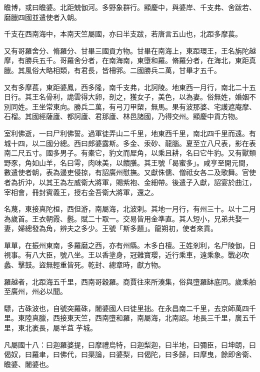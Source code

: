 \begin{pinyinscope}
 瞻博，或曰瞻婆。北距兢伽河。多野象群行。顯慶中，與婆岸、千支弗、舍跋若、磨臘四國並遣使者入朝。



 千支在西南海中，本南天竺屬國，亦曰半支跋，若唐言五山也，北距多摩萇。



 又有哥羅舍分、脩羅分、甘畢三國貢方物。甘畢在南海上，東距環王，王名旃陀越摩，有勝兵五千。哥羅舍分者，在南海南，東墮和羅。脩羅分者，在海北，東距真臘。其風俗大略相類，有君長，皆柵郛。二國勝兵二萬，甘畢才五千。



 又有多摩萇，東距婆鳳，西多隆，南千支弗，北訶陵。地東西一月行，南北二十五日行。其王名骨利，詭雲得大卵，剖之，獲女子，美色，以為妻。俗無姓，婚姻不別同姓。王坐常東向。勝兵二萬，有弓刀甲槊，無馬。果有波那婆、宅護遮庵摩、石榴。其國經薩廬、都訶廬、君那廬、林邑諸國，乃得交州。顯慶中貢方物。



 室利佛逝，一曰尸利佛誓。過軍徒弄山二千里，地東西千里，南北四千里而遠。有城十四，以二國分總。西曰郎婆露斯。多金、汞砂、龍腦。夏至立八尺表，影在表南二尺五寸。國多男子。有橐它，豹文而犀角，以乘且耕，名曰它牛豹。又有獸類野豕，角如山羊，名曰雩，肉味美，以饋膳。其王號「曷蜜多」。咸亨至開元間，數遣使者朝，表為邊吏侵掠，有詔廣州慰撫。又獻侏儒、僧祗女各二及歌舞。官使者為折沖，以其王為左威衛大將軍，賜紫袍、金細帶。後遣子入獻，詔宴於曲江，宰相會，冊封賓義王，授右金吾衛大將軍，還之。



 名蔑，東接真陀桓，西但游，南屬海，北波剌。其地一月行，有州三十。以十二月為歲首。王衣朝霞、氎。賦二十取一。交易皆用金準直。其人短小，兄弟共娶一妻，婦總發為角，辨夫之多少。王號「斯多題」。龍朔初，使者來貢。



 單單，在振州東南，多羅磨之西，亦有州縣。木多白檀。王姓剎利，名尸陵伽，日視事。有八大臣，號八坐。王以香塗身，冠雜寶瓔，近行乘車，遠乘象。戰必吹蠡、擊鼓。盜無輕重皆死。乾封、總章時，獻方物。



 羅越者，北距海五千里，西南哥穀羅。商賈往來所湊集，俗與墮羅缽底同。歲乘舶至廣州，州必以聞。



 驃，古硃波也，自號突羅硃，闍婆國人曰徒里拙。在永昌南二千里，去京師萬四千里。東陸真臘，西接東天竺，西南墮和羅，南屬海，北南詔。地長三千里，廣五千里，東北袤長，屬羊苴芋城。



 凡屬國十八：曰迦羅婆提，曰摩禮烏特，曰迦梨迦，曰半地，曰彌臣，曰坤朗，曰偈奴，曰羅聿，曰佛代，曰渠論，曰婆梨，曰偈陀，曰多歸，曰摩曳，餘即舍衛、瞻婆、闍婆也。




\end{pinyinscope}
